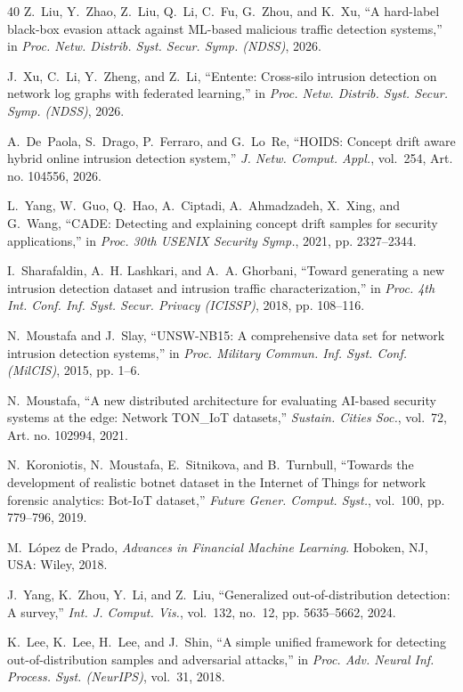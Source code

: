 \begin{thebibliography}{40}
Z.~Liu, Y.~Zhao, Z.~Liu, Q.~Li, C.~Fu, G.~Zhou, and K.~Xu, ``A hard-label black-box evasion attack against ML-based malicious traffic detection systems,'' in \emph{Proc. Netw. Distrib. Syst. Secur. Symp. (NDSS)}, 2026.

J.~Xu, C.~Li, Y.~Zheng, and Z.~Li, ``Entente: Cross-silo intrusion detection on network log graphs with federated learning,'' in \emph{Proc. Netw. Distrib. Syst. Secur. Symp. (NDSS)}, 2026.

A.~De~Paola, S.~Drago, P.~Ferraro, and G.~Lo~Re, ``HOIDS: Concept drift aware hybrid online intrusion detection system,'' \emph{J. Netw. Comput. Appl.}, vol.~254, Art. no. 104556, 2026.

L.~Yang, W.~Guo, Q.~Hao, A.~Ciptadi, A.~Ahmadzadeh, X.~Xing, and G.~Wang, ``CADE: Detecting and explaining concept drift samples for security applications,'' in \emph{Proc. 30th USENIX Security Symp.}, 2021, pp. 2327--2344.

I.~Sharafaldin, A.~H. Lashkari, and A.~A. Ghorbani, ``Toward generating a new intrusion detection dataset and intrusion traffic characterization,'' in \emph{Proc. 4th Int. Conf. Inf. Syst. Secur. Privacy (ICISSP)}, 2018, pp. 108--116.

N.~Moustafa and J.~Slay, ``UNSW-NB15: A comprehensive data set for network intrusion detection systems,'' in \emph{Proc. Military Commun. Inf. Syst. Conf. (MilCIS)}, 2015, pp. 1--6.

N.~Moustafa, ``A new distributed architecture for evaluating AI-based security systems at the edge: Network TON\_IoT datasets,'' \emph{Sustain. Cities Soc.}, vol.~72, Art. no. 102994, 2021.

N.~Koroniotis, N.~Moustafa, E.~Sitnikova, and B.~Turnbull, ``Towards the development of realistic botnet dataset in the Internet of Things for network forensic analytics: Bot-IoT dataset,'' \emph{Future Gener. Comput. Syst.}, vol.~100, pp. 779--796, 2019.

M.~L\'{o}pez de Prado, \emph{Advances in Financial Machine Learning}. Hoboken, NJ, USA: Wiley, 2018.

J.~Yang, K.~Zhou, Y.~Li, and Z.~Liu, ``Generalized out-of-distribution detection: A survey,'' \emph{Int. J. Comput. Vis.}, vol.~132, no.~12, pp. 5635--5662, 2024.

K.~Lee, K.~Lee, H.~Lee, and J.~Shin, ``A simple unified framework for detecting out-of-distribution samples and adversarial attacks,'' in \emph{Proc. Adv. Neural Inf. Process. Syst. (NeurIPS)}, vol.~31, 2018.


\end{thebibliography}
